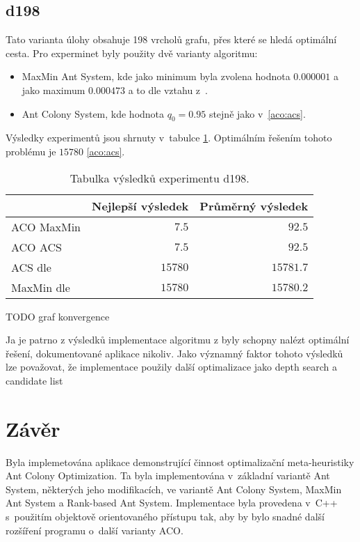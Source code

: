 \documentclass[a4paper, 12pt]{article}
\begin{document}
\subsection{d198}
Tato varianta úlohy obsahuje 198 vrcholů grafu, přes které se hledá optimální cesta. Pro experminet byly použity dvě varianty algoritmu:
\begin{itemize}
  \item MaxMin Ant System, kde jako minimum byla zvolena hodnota $0.000001$ a jako maximum $0.000473$ a to dle vztahu z~\cite{aco:maxmintsp}.
  \item Ant Colony System, kde hodnota $q_0=0.95$ stejně jako v~\ref{aco:acs}.
\end{itemize}
Výsledky experimentů jsou shrnuty v~tabulce \ref{tabd198}. Optimálním řešením tohoto problému je $15 780$ \ref{aco:acs}.
\begin{table}[tb]
\begin{center}
  \begin{tabular}{ | l | r | r |}
   \hline
    & \textbf{Nejlepší výsledek} & \textbf{Průměrný výsledek} \\ \hline \hline
    ACO MaxMin & $7.5$ & $92.5$ \\ \hline
    ACO ACS & $7.5$ & $92.5$ \\ \hline
    ACS dle \cite{aco:acs} & $15 780$ & $15 781.7$ \\ \hline
    MaxMin dle \cite{aco:maxmintsp} & $15 780$ & $15 780.2$\\ \hline
   \end{tabular}
   \caption{Tabulka výsledků experimentu d198.}
   \label{tabd198}
\end{center}
\end{table}
TODO graf konvergence

Ja je patrno z výsledků implementace algoritmu z \cite{aco:maxmintsp,aco:acs} byly schopny nalézt optimální řešení, dokumentované aplikace nikoliv. Jako významný
faktor tohoto výsledků lze považovat, že implementace použily další optimalizace jako depth search a candidate list

\section{Závěr}
\label{sec:concl}
Byla implemetována aplikace demonstrující činnost optimalizační meta-heuristiky Ant Colony Optimization. 
Ta byla implementována v~základní variantě Ant System, některých
jeho modifikacích, ve variantě Ant Colony System, MaxMin Ant System a Rank-based Ant System. Implementace byla provedena v~C++ s~použitím objektově orientovaného
přístupu tak, aby by bylo snadné další rozšíření programu o~další varianty ACO.
\end{document}
